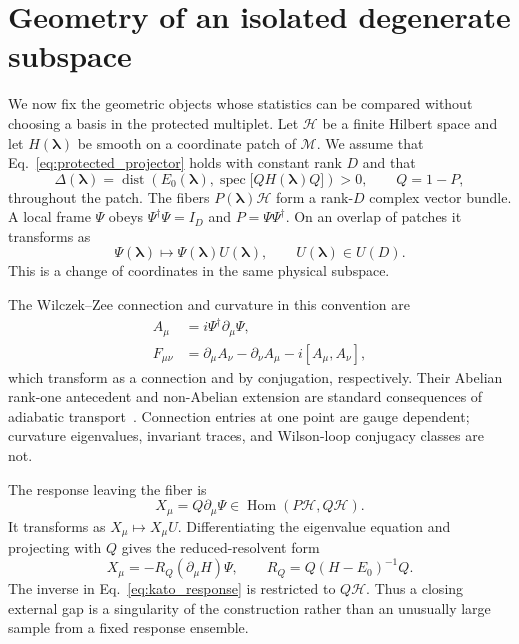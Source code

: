 \section{Geometry of an isolated degenerate subspace}
\label{sec:bundle_geometry}

We now fix the geometric objects whose statistics can be compared without
choosing a basis in the protected multiplet.  Let $\mathcal H$ be a finite
Hilbert space and let $H(\boldsymbol\lambda)$ be smooth on a coordinate patch
of $\mathcal M$.  We assume that Eq.~\eqref{eq:protected_projector} holds with
constant rank $D$ and that
\begin{equation}
 \Delta(\boldsymbol\lambda)
 =\operatorname{dist}\!\left(
 E_0(\boldsymbol\lambda),
 \operatorname{spec}\bigl[QH(\boldsymbol\lambda)Q\bigr]
 \right)>0,
 \qquad Q=1-P,
 \label{eq:external_gap}
\end{equation}
throughout the patch.  The fibers $P(\boldsymbol\lambda)\mathcal H$ form a
rank-$D$ complex vector bundle.  A local frame $\Psi$ obeys
$\Psi^\dagger\Psi=I_D$ and $P=\Psi\Psi^\dagger$.  On an overlap of patches it
transforms as
\begin{equation}
 \Psi(\boldsymbol\lambda)\longmapsto
 \Psi(\boldsymbol\lambda)U(\boldsymbol\lambda),
 \qquad U(\boldsymbol\lambda)\in U(D).
 \label{eq:fiber_gauge}
\end{equation}
This is a change of coordinates in the same physical subspace.

The Wilczek--Zee connection and curvature in this convention are
\begin{align}
 A_\mu&=i\Psi^\dagger\partial_\mu\Psi,\nonumber\\
 F_{\mu\nu}
 &=\partial_\mu A_\nu-\partial_\nu A_\mu-i[A_\mu,A_\nu],
 \label{eq:connection_curvature}
\end{align}
which transform as a connection and by conjugation, respectively.  Their
Abelian rank-one antecedent and non-Abelian extension are standard
consequences of adiabatic transport~\cite{berry1984,wilczekzee1984,kato1950}.
Connection entries at one point are gauge dependent; curvature eigenvalues,
invariant traces, and Wilson-loop conjugacy classes are not.

The response leaving the fiber is
\begin{equation}
 X_\mu=Q\partial_\mu\Psi
 \in\operatorname{Hom}(P\mathcal H,Q\mathcal H).
 \label{eq:offfiber_response}
\end{equation}
It transforms as $X_\mu\mapsto X_\mu U$.  Differentiating the eigenvalue
equation and projecting with $Q$ gives the reduced-resolvent form
\begin{equation}
 X_\mu=-R_Q(\partial_\mu H)\Psi,
 \qquad
 R_Q=Q(H-E_0)^{-1}Q .
 \label{eq:kato_response}
\end{equation}
The inverse in Eq.~\eqref{eq:kato_response} is restricted to $Q\mathcal H$.
Thus a closing external gap is a singularity of the construction rather than
an unusually large sample from a fixed response ensemble.

